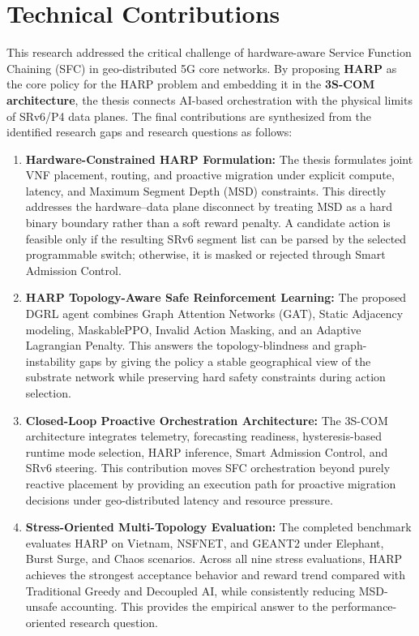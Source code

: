 \documentclass[12pt, a4paper, reqno, oneside]{book}
\begin{document}
\section{Technical Contributions}
This research addressed the critical challenge of hardware-aware Service Function Chaining (SFC) in geo-distributed 5G core networks. By proposing \textbf{HARP} as the core policy for the HARP problem and embedding it in the \textbf{3S-COM architecture}, the thesis connects AI-based orchestration with the physical limits of SRv6/P4 data planes. The final contributions are synthesized from the identified research gaps and research questions as follows:
\begin{enumerate}
    \item \textbf{Hardware-Constrained HARP Formulation:} The thesis formulates joint VNF placement, routing, and proactive migration under explicit compute, latency, and Maximum Segment Depth (MSD) constraints. This directly addresses the hardware--data plane disconnect by treating MSD as a hard binary boundary rather than a soft reward penalty. A candidate action is feasible only if the resulting SRv6 segment list can be parsed by the selected programmable switch; otherwise, it is masked or rejected through Smart Admission Control.
    \item \textbf{HARP Topology-Aware Safe Reinforcement Learning:} The proposed DGRL agent combines Graph Attention Networks (GAT), Static Adjacency modeling, MaskablePPO, Invalid Action Masking, and an Adaptive Lagrangian Penalty. This answers the topology-blindness and graph-instability gaps by giving the policy a stable geographical view of the substrate network while preserving hard safety constraints during action selection.
    \item \textbf{Closed-Loop Proactive Orchestration Architecture:} The 3S-COM architecture integrates telemetry, forecasting readiness, hysteresis-based runtime mode selection, HARP inference, Smart Admission Control, and SRv6 steering. This contribution moves SFC orchestration beyond purely reactive placement by providing an execution path for proactive migration decisions under geo-distributed latency and resource pressure.
    \item \textbf{Stress-Oriented Multi-Topology Evaluation:} The completed benchmark evaluates HARP on Vietnam, NSFNET, and GEANT2 under Elephant, Burst Surge, and Chaos scenarios. Across all nine stress evaluations, HARP achieves the strongest acceptance behavior and reward trend compared with Traditional Greedy and Decoupled AI, while consistently reducing MSD-unsafe accounting. This provides the empirical answer to the performance-oriented research question.

\end{enumerate}
\end{document}
